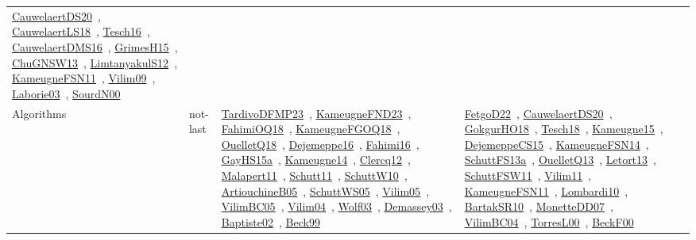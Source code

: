 {\begin{longtable}{lp{3cm}>{\raggedright\arraybackslash}p{6cm}>{\raggedright\arraybackslash}p{6cm}>{\raggedright\arraybackslash}p{8cm}}
\href{works/CauwelaertDS20.pdf}{CauwelaertDS20}~\cite{CauwelaertDS20}, \href{works/CauwelaertLS18.pdf}{CauwelaertLS18}~\cite{CauwelaertLS18}, \href{works/Tesch16.pdf}{Tesch16}~\cite{Tesch16}, \href{works/CauwelaertDMS16.pdf}{CauwelaertDMS16}~\cite{CauwelaertDMS16}, \href{works/GrimesH15.pdf}{GrimesH15}~\cite{GrimesH15}, \href{works/ChuGNSW13.pdf}{ChuGNSW13}~\cite{ChuGNSW13}, \href{works/LimtanyakulS12.pdf}{LimtanyakulS12}~\cite{LimtanyakulS12}, \href{works/KameugneFSN11.pdf}{KameugneFSN11}~\cite{KameugneFSN11}, \href{works/Vilim09.pdf}{Vilim09}~\cite{Vilim09}, \href{works/Laborie03.pdf}{Laborie03}~\cite{Laborie03}, \href{works/SourdN00.pdf}{SourdN00}~\cite{SourdN00}\\
Algorithms & not-last & \href{works/TardivoDFMP23.pdf}{TardivoDFMP23}~\cite{TardivoDFMP23}, \href{works/KameugneFND23.pdf}{KameugneFND23}~\cite{KameugneFND23}, \href{works/FahimiOQ18.pdf}{FahimiOQ18}~\cite{FahimiOQ18}, \href{works/KameugneFGOQ18.pdf}{KameugneFGOQ18}~\cite{KameugneFGOQ18}, \href{works/OuelletQ18.pdf}{OuelletQ18}~\cite{OuelletQ18}, \href{works/Dejemeppe16.pdf}{Dejemeppe16}~\cite{Dejemeppe16}, \href{works/Fahimi16.pdf}{Fahimi16}~\cite{Fahimi16}, \href{works/GayHS15a.pdf}{GayHS15a}~\cite{GayHS15a}, \href{works/Kameugne14.pdf}{Kameugne14}~\cite{Kameugne14}, \href{works/Clercq12.pdf}{Clercq12}~\cite{Clercq12}, \href{works/Malapert11.pdf}{Malapert11}~\cite{Malapert11}, \href{works/Schutt11.pdf}{Schutt11}~\cite{Schutt11}, \href{works/SchuttW10.pdf}{SchuttW10}~\cite{SchuttW10}, \href{works/ArtiouchineB05.pdf}{ArtiouchineB05}~\cite{ArtiouchineB05}, \href{works/SchuttWS05.pdf}{SchuttWS05}~\cite{SchuttWS05}, \href{works/Vilim05.pdf}{Vilim05}~\cite{Vilim05}, \href{works/VilimBC05.pdf}{VilimBC05}~\cite{VilimBC05}, \href{works/Vilim04.pdf}{Vilim04}~\cite{Vilim04}, \href{works/Wolf03.pdf}{Wolf03}~\cite{Wolf03}, \href{works/Demassey03.pdf}{Demassey03}~\cite{Demassey03}, \href{works/Baptiste02.pdf}{Baptiste02}~\cite{Baptiste02}, \href{works/Beck99.pdf}{Beck99}~\cite{Beck99} & \href{works/FetgoD22.pdf}{FetgoD22}~\cite{FetgoD22}, \href{works/CauwelaertDS20.pdf}{CauwelaertDS20}~\cite{CauwelaertDS20}, \href{works/GokgurHO18.pdf}{GokgurHO18}~\cite{GokgurHO18}, \href{works/Tesch18.pdf}{Tesch18}~\cite{Tesch18}, \href{works/Kameugne15.pdf}{Kameugne15}~\cite{Kameugne15}, \href{works/DejemeppeCS15.pdf}{DejemeppeCS15}~\cite{DejemeppeCS15}, \href{works/KameugneFSN14.pdf}{KameugneFSN14}~\cite{KameugneFSN14}, \href{works/SchuttFS13a.pdf}{SchuttFS13a}~\cite{SchuttFS13a}, \href{works/OuelletQ13.pdf}{OuelletQ13}~\cite{OuelletQ13}, \href{works/Letort13.pdf}{Letort13}~\cite{Letort13}, \href{works/SchuttFSW11.pdf}{SchuttFSW11}~\cite{SchuttFSW11}, \href{works/Vilim11.pdf}{Vilim11}~\cite{Vilim11}, \href{works/KameugneFSN11.pdf}{KameugneFSN11}~\cite{KameugneFSN11}, \href{works/Lombardi10.pdf}{Lombardi10}~\cite{Lombardi10}, \href{works/BartakSR10.pdf}{BartakSR10}~\cite{BartakSR10}, \href{works/MonetteDD07.pdf}{MonetteDD07}~\cite{MonetteDD07}, \href{works/VilimBC04.pdf}{VilimBC04}~\cite{VilimBC04}, \href{works/TorresL00.pdf}{TorresL00}~\cite{TorresL00}, \href{works/BeckF00.pdf}{BeckF00}~\cite{BeckF00} & 
\end{longtable}}
